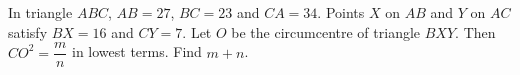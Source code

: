 In triangle $ABC$, $AB=27$, $BC=23$ and $CA=34$. Points $X$ on $AB$ and $Y$ on $AC$ satisfy $BX=16$ and $CY=7$. Let $O$ be the circumcentre of triangle $BXY$. Then $CO^2=\dfrac mn$ in lowest terms. Find $m+n$.
